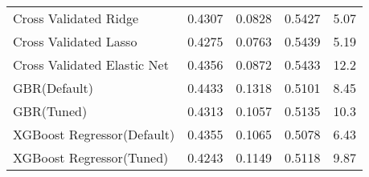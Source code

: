 \begin{table}[H]
\begin{tabular}{lllll}
Cross Validated Ridge       & 0.4307               & 0.0828         & 0.5427        & 5.07          \\
Cross Validated Lasso       & 0.4275               & 0.0763         & 0.5439        & 5.19          \\
Cross Validated Elastic Net & 0.4356               & 0.0872         & 0.5433        & 12.2          \\
GBR(Default)                & 0.4433               & 0.1318         & 0.5101        & 8.45          \\
GBR(Tuned)                  & 0.4313               & 0.1057         & 0.5135        & 10.3          \\
XGBoost Regressor(Default)  & 0.4355               & 0.1065         & 0.5078        & 6.43          \\
XGBoost Regressor(Tuned)    & 0.4243               & 0.1149         & 0.5118        & 9.87         
\end{tabular}\end{table}

